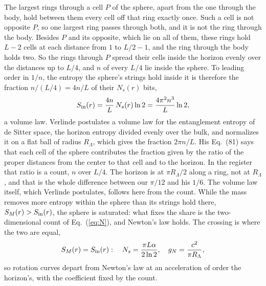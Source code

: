 \documentclass[aps,prd,twocolumn,superscriptaddress,nofootinbib,showkeys]{revtex4-2}
\newcommand{\RL}{R_\Lambda}
\begin{document}
The largest rings through a cell $P$ of the sphere, apart from the one through the body, hold between them every cell off that ring exactly once. Such a cell is not opposite $P$, so one largest ring passes through both, and it is not the ring through the body. Besides $P$ and its opposite, which lie on all of them, these rings hold $L-2$ cells at each distance from $1$ to $L/2-1$, and the ring through the body holds two. So the rings through $P$ spread their cells inside the horizon evenly over the distances up to $L/4$, and $n$ of every $L/4$ lie inside the sphere. To leading order in $1/n$, the entropy the sphere's strings hold inside it is therefore the fraction $n/(L/4) = 4n/L$ of their $N_s(r)$ bits,
\begin{equation}
S_{\rm in}(r) = \frac{4n}{L}\,N_s(r)\ln2 = \frac{4\pi^2 n^3}{L}\ln2 ,
\label{eq:volume}
\end{equation}
a volume law. Verlinde postulates a volume law for the entanglement entropy of de Sitter space, the horizon entropy divided evenly over the bulk, and normalizes it on a flat ball of radius $\RL$, which gives the fraction $2\pi n/L$. His Eq.~(81) says that each cell of the sphere contributes the fraction given by the ratio of the proper distances from the center to that cell and to the horizon. In the register that ratio is a count, $n$ over $L/4$. The horizon is at $\pi\RL/2$ along a ring, not at $\RL$, and that is the whole difference between our $\pi/12$ and his $1/6$. The volume law itself, which Verlinde postulates, follows here from the count. While the mass removes more entropy within the sphere than its strings hold there, $S_M(r) > S_{\rm in}(r)$, the sphere is saturated: what fixes the share is the two-dimensional count of Eq.~(\ref{eq:N}), and Newton's law holds. The crossing is where the two are equal,
\begin{equation}
S_M(r) = S_{\rm in}(r): \quad N_s = \frac{\pi L\alpha}{2\ln2}, \quad g_N = \frac{c^2}{\pi\RL} ,
\label{eq:criterion}
\end{equation}
so rotation curves depart from Newton's law at an acceleration of order the horizon's, with the coefficient fixed by the count.
\end{document}
